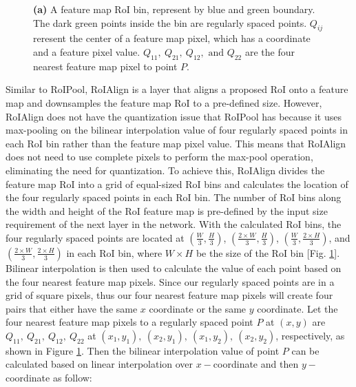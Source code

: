 \begin{figure}[!ht]
    \centering
    \caption{\textbf{(a)} A feature map RoI bin, represent by blue and green boundary. The dark green points inside the bin are regularly spaced points. $Q_{ij}$ reresent the center of a feature map pixel, which has a coordinate and a feature pixel value. $Q_{11},\ Q_{21},\ Q_{12},\text{ and } Q_{22}$ are the four nearest feature map pixel to point $P$.}
    \label{fig:bin_w_regularly_points}
\end{figure}

Similar to RoIPool, RoIAlign is a layer that aligns a proposed RoI onto a feature map and downsamples the feature map RoI to a pre-defined size. However, RoIAlign does not have the quantization issue that RoIPool has because it uses max-pooling on the bilinear interpolation value of four regularly spaced points in each RoI bin rather than the feature map pixel value. This means that RoIAlign does not need to use complete pixels to perform the max-pool operation, eliminating the need for quantization. To achieve this, RoIAlign divides the feature map RoI into a grid of equal-sized RoI bins and calculates the location of the four regularly spaced points in each RoI bin. The number of RoI bins along the width and height of the RoI feature map is pre-defined by the input size requirement of the next layer in the network. With the calculated RoI bins, the four regularly spaced points are located at $(\frac{W}{3}, \frac{H}{3})$, $(\frac{2 \times W}{3}, \frac{H}{3})$, $(\frac{W}{3}, \frac{2 \times H}{3})$, and $(\frac{2 \times W}{3}, \frac{2 \times H}{3})$ in each RoI bin, where $W \times H$ be the size of the RoI bin [Fig. \ref{fig:bin_w_regularly_points}]. Bilinear interpolation is then used to calculate the value of each point based on the four nearest feature map pixels. {\color{red} Since our regularly spaced points are in a grid of square pixels, thus our four nearest feature map pixels will create four pairs that either have the same $x$ coordinate or the same $y$ coordinate}. Let the four nearest feature map pixels to a regularly spaced point $P$ at $(x, y)$ are $Q_{11},\ Q_{21},\ Q_{12},\ Q_{22}$ at $(x_1, y_1),\ (x_2, y_1),\ (x_1, y_2),\ (x_2, y_2)$, respectively, as shown in Figure \ref{fig:bin_w_regularly_points}. Then the bilinear interpolation value of point $P$ can be calculated based on linear interpolation over $x-$coordinate and then $y-$coordinate as follow:

